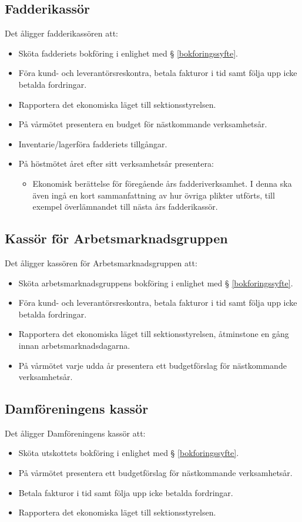 \documentclass{datateknologsektionen-document}
\begin{document}
\subsection{Fadderikassör}
\label{fadderikassor}
Det åligger fadderikassören att:
\begin{itemize}
  \item Sköta fadderiets bokföring i enlighet med § \ref{bokforingssyfte}.
  \item Föra kund- och leverantörsreskontra, betala fakturor i tid samt följa upp icke betalda fordringar.
  \item Rapportera det ekonomiska läget till sektionsstyrelsen.
  \item På vårmötet presentera en budget för nästkommande verksamhetsår.
  \item Inventarie/lagerföra fadderiets tillgångar.
  \item På höstmötet året efter sitt verksamhetsår presentera:
  \begin{itemize}
    \item Ekonomisk berättelse för föregående års fadderiverksamhet. I denna ska även ingå
    en kort sammanfattning av hur övriga plikter utförts, till exempel överlämnandet till
    nästa års fadderikassör.
  \end{itemize}
\end{itemize}

\subsection{Kassör för Arbetsmarknadsgruppen}
\label{amgkassor}
Det åligger kassören för Arbetsmarknadsgruppen att:
\begin{itemize}
  \item Sköta arbetsmarknadsgruppens bokföring i enlighet med § \ref{bokforingssyfte}.
  \item Föra kund- och leverantörsreskontra, betala fakturor i tid samt följa upp icke betalda fordringar.
  \item Rapportera det ekonomiska läget till sektionsstyrelsen, åtminstone en gång innan arbetsmarknadsdagarna.
  \item På vårmötet varje udda år presentera ett budgetförslag för nästkommande verksamhetsår.
\end{itemize}

\subsection{Damföreningens kassör}
\label{damforeningskassor}
Det åligger Damföreningens kassör att:
\begin{itemize}
  \item Sköta utskottets bokföring i enlighet med § \ref{bokforingssyfte}.
  \item På vårmötet presentera ett budgetförslag för nästkommande verksamhetsår.
  \item Betala fakturor i tid samt följa upp icke betalda fordringar.
  \item Rapportera det ekonomiska läget till sektionsstyrelsen.
\end{itemize}
\end{document}
